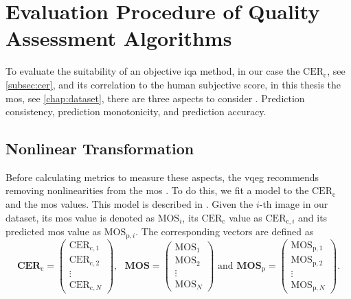 

\section{Evaluation Procedure of Quality Assessment Algorithms}
\label{sec:evalprocedure}

To evaluate the suitability of an objective \gls{iqa} method, in our case the $\text{CER}_{\text{c}}$, see \autoref{subsec:cer}, and its correlation to the human subjective score, in this thesis the \gls{mos}, see \autoref{chap:dataset}, there are three aspects to consider \cite{nonlin_fit_original_2003}\cite{iqa_survey_2020}.
Prediction consistency, prediction monotonicity, and prediction accuracy.

\subsection{Nonlinear Transformation}
\label{subsec:nonlinear}

Before calculating metrics to measure these aspects, the \gls{vqeg} recommends removing nonlinearities from the \gls{mos} \cite{nonlin_fit_original_2003}.
To do this, we fit a model to the $\text{CER}_{\text{c}}$ and the \gls{mos} values.
This model is described in \cite{nonlin_fit_model_init_2000}\cite{nonlin_fit_appl_2017}.
Given the $i$-th image in our dataset, its \gls{mos} value is denoted as $\text{MOS}_{i}$, its $\text{CER}_{\text{c}}$ value as $\text{CER}_{\text{c},i}$ and its predicted \gls{mos} value as $\text{MOS}_{\text{p},i}$.
The corresponding vectors are defined as
\begin{equation}
    \mathbf{CER}_{\text{c}} =
    \begin{pmatrix}
        \text{CER}_{\text{c},1} \\
        \text{CER}_{\text{c},2} \\
        \vdots \\
        \text{CER}_{\text{c},N}
    \end{pmatrix},\text{ }
    \mathbf{MOS} =
    \begin{pmatrix}
        \text{MOS}_{1} \\
        \text{MOS}_{2} \\
        \vdots \\
        \text{MOS}_{N}
    \end{pmatrix} \text{ and }
    \mathbf{MOS}_{\text{p}} =
    \begin{pmatrix}
        \text{MOS}_{\text{p},1} \\
        \text{MOS}_{\text{p},2} \\
        \vdots \\
        \text{MOS}_{\text{p},N}
    \end{pmatrix}.
\end{equation}


